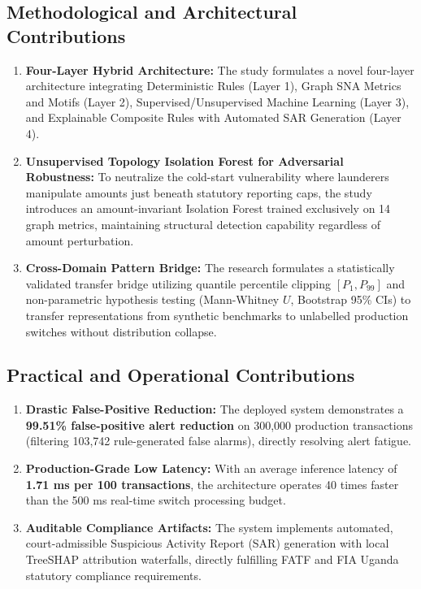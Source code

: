 \subsection{Methodological and Architectural Contributions}
\begin{enumerate}
    \item \textbf{Four-Layer Hybrid Architecture:} The study formulates a novel four-layer architecture integrating Deterministic Rules (Layer 1), Graph SNA Metrics and Motifs (Layer 2), Supervised/Unsupervised Machine Learning (Layer 3), and Explainable Composite Rules with Automated SAR Generation (Layer 4).
    \item \textbf{Unsupervised Topology Isolation Forest for Adversarial Robustness:} To neutralize the cold-start vulnerability where launderers manipulate amounts just beneath statutory reporting caps, the study introduces an amount-invariant Isolation Forest trained exclusively on 14 graph metrics, maintaining structural detection capability regardless of amount perturbation.
    \item \textbf{Cross-Domain Pattern Bridge:} The research formulates a statistically validated transfer bridge utilizing quantile percentile clipping $[P_1, P_{99}]$ and non-parametric hypothesis testing (Mann-Whitney $U$, Bootstrap 95\% CIs) to transfer representations from synthetic benchmarks to unlabelled production switches without distribution collapse.
\end{enumerate}

\subsection{Practical and Operational Contributions}
\begin{enumerate}
    \item \textbf{Drastic False-Positive Reduction:} The deployed system demonstrates a \textbf{99.51\% false-positive alert reduction} on 300,000 production transactions (filtering 103,742 rule-generated false alarms), directly resolving alert fatigue.
    \item \textbf{Production-Grade Low Latency:} With an average inference latency of \textbf{1.71 ms per 100 transactions}, the architecture operates 40 times faster than the 500 ms real-time switch processing budget.
    \item \textbf{Auditable Compliance Artifacts:} The system implements automated, court-admissible Suspicious Activity Report (SAR) generation with local TreeSHAP attribution waterfalls, directly fulfilling FATF and FIA Uganda statutory compliance requirements.
\end{enumerate}

